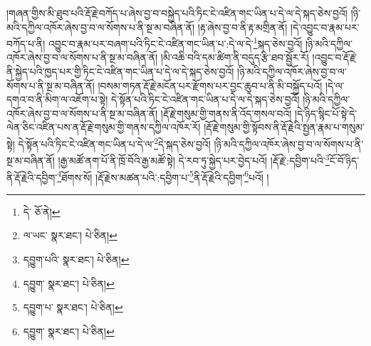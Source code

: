 །གཞན་གྱིས་མི་ཐུབ་པའི་རྡོ་རྗེ་བཀོད་པ་ཞེས་བྱ་བ་བསྐྱེད་པའི་ཏིང་ངེ་འཛིན་གང་ཡིན་པ་དེ་ལ་དེ་སྐད་ཅེས་བྱའོ། །ཉི་མའི་དཀྱིལ་འཁོར་ཞེས་བྱ་བ་ལ་སོགས་པ་ནི་སྔ་མ་བཞིན་ནོ། །རྟ་ཞེས་བྱ་བ་ནི་རྟ་མགྲིན་ནོ། །དེ་འབྱུང་བ་རྣམ་པར་བཀོད་པ་ནི། འབྱུང་བ་རྣམ་པར་བཞག་པའི་ཏིང་ངེ་འཛིན་གང་ཡིན་པ་:དེ་ལ་དེ་\footnote{དེ་  ཅོ་ནེ། }སྐད་ཅེས་བྱའོ། །ཉི་མའི་དཀྱིལ་འཁོར་ཞེས་བྱ་བ་ལ་སོགས་པ་ནི་སྔ་མ་བཞིན་ནོ། །མི་འཆི་བའི་དམ་ཚིག་ནི་བདུད་རྩི་ཐབ་སྦྱོར་རོ། །འབྱུང་བ་རྡོ་རྗེ་ནི་སྐྱེད་པའི་ཁྱད་པར་གྱི་ཏིང་ངེ་འཛིན་གང་ཡིན་པ་དེ་ལ་དེ་སྐད་ཅེས་བྱའོ། །ཉི་མའི་དཀྱིལ་འཁོར་ཞེས་བྱ་བ་ལ་སོགས་པ་ནི་སྔ་མ་བཞིན་ནོ། །བསམ་གཏན་རྡོ་རྗེ་མངོན་པར་རྫོགས་པར་བྱང་ཆུབ་པ་ནི་མི་བསྐྱོད་པའོ། །དེ་ལ་དགའ་བ་ནི་མིག་ལ་འཇོག་པ་སྟེ། དེ་སྟོན་པའི་ཏིང་ངེ་འཛིན་གང་ཡིན་པ་དེ་ལ་དེ་སྐད་ཅེས་བྱའོ། །ཉི་མའི་དཀྱིལ་འཁོར་ཞེས་བྱ་བ་ལ་སོགས་པ་ནི་སྔ་མ་བཞིན་ནོ། །རྡོ་རྗེ་གསུམ་གྱི་གནས་ནི་འོད་གསལ་བའོ། །དེ་ཉིད་སྙིང་པོ་སྟེ་དེ་ལེན་ཅིང་འཛིན་པས་ན་རྡོ་རྗེ་གསུམ་གྱི་གནས་དཀྱིལ་འཁོར་རོ། །རྡོ་རྗེ་གསུམ་གྱི་སྟོབས་ནི་རྡོ་རྗེའི་སྤྱན་རྣམ་པ་གསུམ་སྟེ། དེ་སྟོན་པའི་ཏིང་ངེ་འཛིན་གང་ཡིན་པ་དེ་ལ་\footnote{ལ་ཡང་  སྣར་ཐང་།  པེ་ཅིན། }དེ་སྐད་ཅེས་བྱའོ། །ཉི་མའི་དཀྱིལ་འཁོར་ཞེས་བྱ་བ་ལ་སོགས་པ་ནི་སྔ་མ་བཞིན་ནོ། །རྒྱ་མཚོ་ནག་པོ་ནི་ཁྲོ་བོའི་རྒྱ་མཚོ་སྟེ། དེ་རབ་ཏུ་སྐྱེད་པར་བྱེད་པའོ། །རྡོ་རྗེ་:དབྱིག་པའི་\footnote{དབྱུག་པའི་  སྣར་ཐང་།  པེ་ཅིན། }ངོ་བོ་ཉིད་ནི་རྡོ་རྗེའི་དབྱིག་\footnote{དབྱུག་  སྣར་ཐང་།  པེ་ཅིན། }ཐོགས་སོ། །རྡོ་རྗེས་མཚན་པའི་:དབྱིག་པ་\footnote{དབྱུག་པ་  སྣར་ཐང་།  པེ་ཅིན། }ནི་རྡོ་རྗེའི་དབྱིག་\footnote{དབྱུག་  སྣར་ཐང་།  པེ་ཅིན། }པའོ། །
